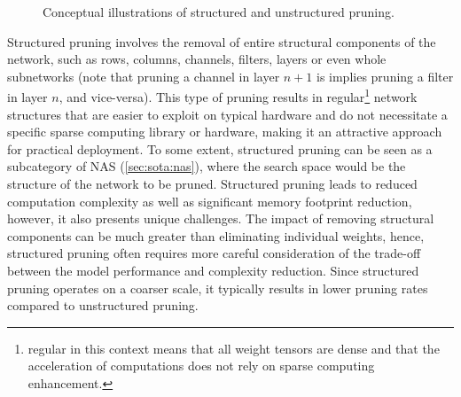 \begin{figure}
\centering
{}
    \hspace{0.09\textwidth}
\caption{Conceptual illustrations of structured and unstructured pruning.}
\label{fig:sota:pruning}
\end{figure}

Structured pruning involves the removal of entire structural components of the
network, such as rows, columns, channels, filters, layers or even whole
subnetworks (note that pruning a channel in layer $n+1$ is implies pruning a
filter in layer $n$, and vice-versa). This type of pruning results in
regular\footnote{regular in this context means that all weight tensors are dense
and that the acceleration of computations does not rely on sparse computing
enhancement.} network structures that are easier to exploit on typical hardware
and do not necessitate a specific sparse computing library or hardware, making
it an attractive approach for practical deployment. To some extent, structured
pruning can be seen as a subcategory of \acl{NAS} (\cref{sec:sota:nas}), where
the search space would be the structure of the network to be pruned. Structured
pruning leads to reduced computation complexity as well as significant memory
footprint reduction, however, it also presents unique challenges. The impact of
removing structural components can be much greater than eliminating individual
weights, hence, structured pruning often requires more careful consideration of
the trade-off between the model performance and complexity reduction. Since
structured pruning operates on a coarser scale, it typically results in lower
pruning rates compared to unstructured pruning.\\


